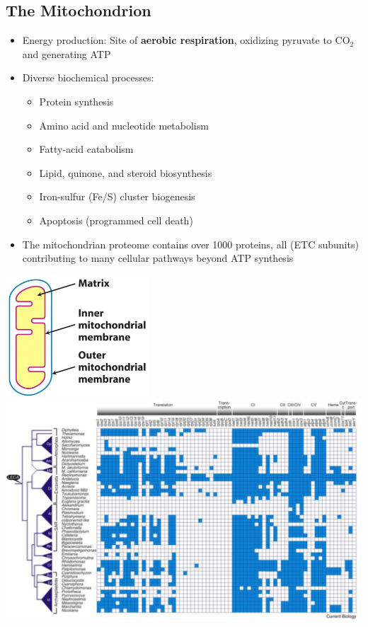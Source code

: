 \documentclass[10pt]{article}
\begin{document}
\subsection*{The Mitochondrion}
\begin{itemize}
	\item Energy production: Site of \textbf{aerobic respiration}, oxidizing pyruvate to CO$_2$ and generating ATP
	\item Diverse biochemical processes:
	\begin{itemize}
        \item Protein synthesis
        \item Amino acid and nucleotide metabolism
        \item Fatty-acid catabolism
        \item Lipid, quinone, and steroid biosynthesis
        \item Iron-sulfur (Fe/S) cluster biogenesis
        \item Apoptosis (programmed cell death)
    \end{itemize}
    \item The mitochondrian proteome contains over 1000 proteins, all (ETC subunits) contributing to many cellular pathways beyond ATP synthesis
\end{itemize}
\begin{center} 
    \includegraphics*[width=0.4\textwidth]{L3_4.png}
	\includegraphics*[width=\textwidth]{L3_5.png}
\end{center}
\end{document}
